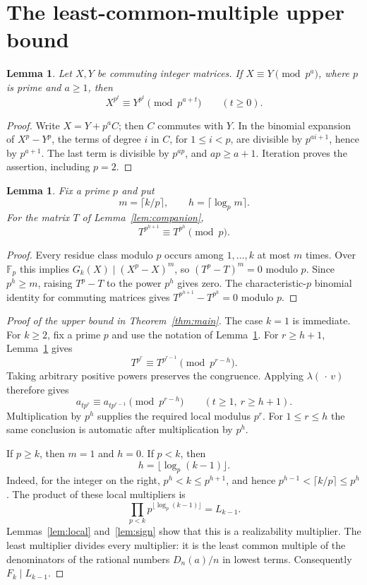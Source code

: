 \documentclass[11pt]{article}
\newtheorem{lemma}[theorem]{Lemma}
\theoremstyle{remark}
\begin{document}
\section{The least-common-multiple upper bound}
\begin{lemma}\label{lem:lift}
Let $X,Y$ be commuting integer matrices. If $X\equiv Y\pmod {p^a}$,
where $p$ is prime and $a\geq1$, then
\[
 X^{p^t}\equiv Y^{p^t}\pmod {p^{a+t}}\qquad(t\geq0).
\]
\end{lemma}
\begin{proof}
Write $X=Y+p^aC$; then $C$ commutes with $Y$. In the binomial expansion
of $X^p-Y^p$, the terms of degree $i$ in $C$, for $1\leq i<p$, are
divisible by $p^{ai+1}$, hence by $p^{a+1}$. The last term is divisible
by $p^{ap}$, and $ap\geq a+1$. Iteration proves the assertion, including
$p=2$.
\end{proof}

\begin{lemma}\label{lem:frob}
Fix a prime $p$ and put
\[
 m=\lceil k/p\rceil,\qquad h=\lceil\log_p m\rceil.
\]
For the matrix $T$ of Lemma~\ref{lem:companion},
\[
 T^{p^{h+1}}\equiv T^{p^h}\pmod p.
\]
\end{lemma}
\begin{proof}
Every residue class modulo $p$ occurs among $1,\ldots,k$ at most $m$
times. Over $\mathbb F_p$ this implies
$G_k(X)\mid(X^p-X)^m$, so $(T^p-T)^m=0$ modulo $p$.
Since $p^h\geq m$, raising $T^p-T$ to the power $p^h$ gives zero.
The characteristic-$p$ binomial identity for commuting matrices gives
$T^{p^{h+1}}-T^{p^h}=0$ modulo $p$.
\end{proof}

\begin{proof}[Proof of the upper bound in Theorem~\ref{thm:main}]
The case $k=1$ is immediate. For $k\geq2$, fix a prime $p$ and use the
notation of Lemma~\ref{lem:frob}. For $r\geq h+1$, Lemma~\ref{lem:lift}
gives
\[
 T^{p^r}\equiv T^{p^{r-1}}\pmod {p^{r-h}}.
\]
Taking arbitrary positive powers preserves the congruence. Applying
$\lambda(\,\cdot\,v)$ therefore gives
\[
 a_{tp^r}\equiv a_{tp^{r-1}}\pmod {p^{r-h}}
 \qquad(t\geq1,\ r\geq h+1).
\]
Multiplication by $p^h$ supplies the required local modulus $p^r$.
For $1\leq r\leq h$ the same conclusion is automatic after multiplication
by $p^h$.

If $p\geq k$, then $m=1$ and $h=0$. If $p<k$, then
\begin{equation}\label{eq:h}
 h=\lfloor\log_p(k-1)\rfloor.
\end{equation}
Indeed, for the integer on the right, $p^h<k\leq p^{h+1}$, and hence
$p^{h-1}<\lceil k/p\rceil\leq p^h$.
The product of these local multipliers is
\[
 \prod_{p<k}p^{\lfloor\log_p(k-1)\rfloor}=L_{k-1}.
\]
Lemmas~\ref{lem:local} and~\ref{lem:sign} show that this is a realizability
multiplier. The least multiplier divides every multiplier: it is the least
common multiple of the denominators of the rational numbers $D_n(a)/n$
in lowest terms. Consequently $F_k\mid L_{k-1}$.
\end{proof}
\end{document}
